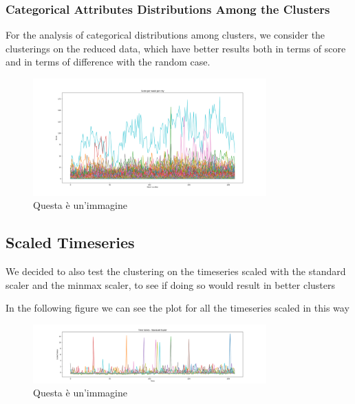 \subsubsection{Categorical Attributes Distributions Among the Clusters}

For the analysis of categorical distributions among clusters, we consider the clusterings on the reduced data, which have better results both in terms of score and in terms of difference with the random case.



\begin{figure}[ht]
    \centering
    \includegraphics[width= 0.8\textwidth]{images/Capitolo1/score_per_week_per_city.png} 
    \caption{Questa è un'immagine} 
    \label{fig:score_per_week_per_city}
\end{figure}

\subsection{Scaled Timeseries}

We decided to also test the clustering on the timeseries scaled with the standard scaler and the minmax scaler, to see if doing so would result in better clusters

In the following figure we can see the plot for all the timeseries scaled in this way

\begin{figure}[ht]
    \centering
    \includegraphics[width= 0.8\textwidth]{images/Capitolo1/time_series_standard_scaler.png} 
    \caption{Questa è un'immagine} 
    \label{fig:time_series_standard_scaler}
\end{figure}

